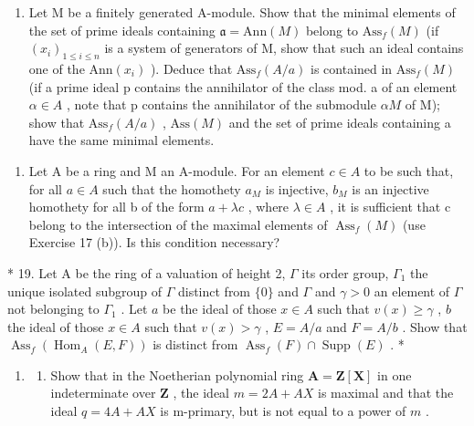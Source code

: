 \begin{enumerate}
\def\labelenumi{(\alph{enumi})}
\setcounter{enumi}{9}
\tightlist
\item
  Let M be a finitely generated A-module. Show that the minimal elements of the set of prime ideals containing \(\mathfrak{a} = \text{Ann}(M)\) belong to \(\text{Ass}_{f}(M)\) (if \((x_{i})_{1 \leq i \leq n}\) is a system of generators of M, show that such an ideal contains one of the \(\text{Ann}(x_{i})\) ). Deduce that \(\text{Ass}_{f}(A/a)\) is contained in \(\text{Ass}_{f}(M)\) (if a prime ideal p contains the annihilator of the class mod. a of an element \(\alpha \in A\) , note that p contains the annihilator of the submodule \(\alpha M\) of M); show that \(\text{Ass}_{f}(A/a)\) , \(\text{Ass}(M)\) and the set of prime ideals containing a have the same minimal elements.
\end{enumerate}

\begin{enumerate}
\def\labelenumi{\arabic{enumi}.}
\setcounter{enumi}{17}
\tightlist
\item
  Let A be a ring and M an A-module. For an element \(c \in A\) to be such that, for all \(a \in A\) such that the homothety \(a_{M}\) is injective, \(b_{M}\) is an injective homothety for all b of the form \(a + \lambda c\) , where \(\lambda \in A\) , it is sufficient that c belong to the intersection of the maximal elements of \(\operatorname{Ass}_{f}(M)\) (use Exercise 17 (b)). Is this condition necessary?
\end{enumerate}

* 19. Let A be the ring of a valuation of height 2, \(\Gamma\) its order group, \(\Gamma_1\) the unique isolated subgroup of \(\Gamma\) distinct from \(\{0\}\) and \(\Gamma\) and \(\gamma > 0\) an element of \(\Gamma\) not belonging to \(\Gamma_1\) . Let \(a\) be the ideal of those \(x \in A\) such that \(v(x) \geqslant \gamma\) , \(b\) the ideal of those \(x \in A\) such that \(v(x) > \gamma\) , \(E = A/a\) and \(F = A/b\) . Show that \(\operatorname{Ass}_f(\operatorname{Hom}_A(E, F))\) is distinct from \(\operatorname{Ass}_f(F) \cap \operatorname{Supp}(E)\) . *


\begin{enumerate}
\def\labelenumi{\arabic{enumi}.}
\tightlist
\item
  \begin{enumerate}
  \def\labelenumii{(\alph{enumii})}
  \tightlist
  \item
    Show that in the Noetherian polynomial ring \(\mathbf{A} = \mathbf{Z}[\mathbf{X}]\) in one indeterminate over \(\mathbf{Z}\) , the ideal \(m = 2A + AX\) is maximal and that the ideal \(q = 4A + AX\) is m-primary, but is not equal to a power of \(m\) .
  \end{enumerate}
\end{enumerate}

